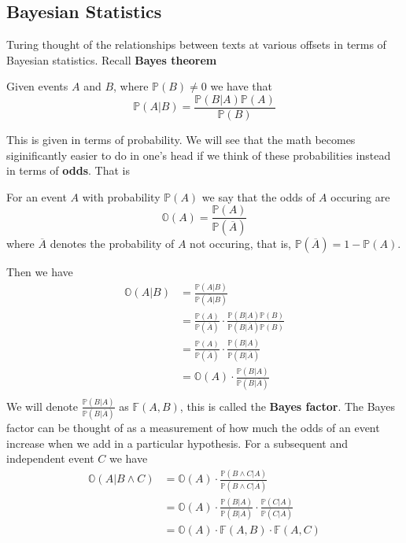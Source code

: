 \subsection{Bayesian Statistics}
Turing thought of the relationships between texts at various
offsets in terms of Bayesian statistics. Recall {\bf{Bayes theorem}}
\begin{theorem}
	Given events $A$ and $B$, where $\mathbb{P}(B) \ne 0$ we have that
	\[
		\mathbb{P}(A|B) = \frac{\mathbb{P}(B|A)\mathbb{P}(A)}{\mathbb{P}(B)}
	\]
\end{theorem}
\noindent This is given in terms of probability. We will see that
the math becomes siginificantly easier to do in one's head if we
think of these probabilities instead in terms of {\bf{odds}}. That is
\begin{definition}
	For an event $A$ with probability $\mathbb{P}(A)$ we say that the
	odds of $A$ occuring are
	\[
		\mathbb{O}(A) = \frac{\mathbb{P}(A)}{\mathbb{P}(\overline{A})}
	\]
	where $\overline{A}$ denotes the probability of $A$ not occuring,
	that is, $\mathbb{P}(\overline{A}) = 1-\mathbb{P}(A)$.
\end{definition}
\noindent Then we have
\begin{align*}
	\mathbb{O}(A|B) & =
	\frac{\mathbb{P}(A|B)}{\mathbb{P}(\overline{A}|B)}
	\\
	                & =
	\frac{\mathbb{P}(A)}{\mathbb{P}(\overline{A})}\cdot\frac{\mathbb{P}(B|A)\mathbb{P}(B)}{\mathbb{P}(B|\overline{A})\mathbb{P}(B)}
	\\
	                & =
	\frac{\mathbb{P}(A)}{\mathbb{P}(\overline{A})}\cdot\frac{\mathbb{P}(B|A)}{\mathbb{P}(B|\overline{A})}
	\\
	                & =
	\mathbb{O}(A)\cdot\frac{\mathbb{P}(B|A)}{\mathbb{P}(B|\overline{A})}
	\\
\end{align*}
\noindent We will denote
$\frac{\mathbb{P}(B|A)}{\mathbb{P}(B|\overline{A})}$ as
$\mathbb{F}(A,B)$, this is called the {\bf{Bayes factor}}. The
Bayes factor can be thought of as a measurement of how much the
odds of an event increase when we add in a particular hypothesis.
For a subsequent and independent event $C$ we have
\begin{align*}
	\mathbb{O}(A|B\wedge C) & =
	\mathbb{O}(A)\cdot\frac{\mathbb{P}(B\wedge C|
		A)}{\mathbb{P}(B\wedge C| \overline{A})}
	\\
	                        & = \mathbb{O}(A)\cdot\frac{\mathbb{P}(B| A)}{\mathbb{P}(B|
		\overline{A})}\cdot\frac{\mathbb{P}(C|A)}{\mathbb{P}(C|\overline{A})}
	\\
	                        & = \mathbb{O}(A)\cdot \mathbb{F}(A,B) \cdot \mathbb{F}(A,C)
\end{align*}
